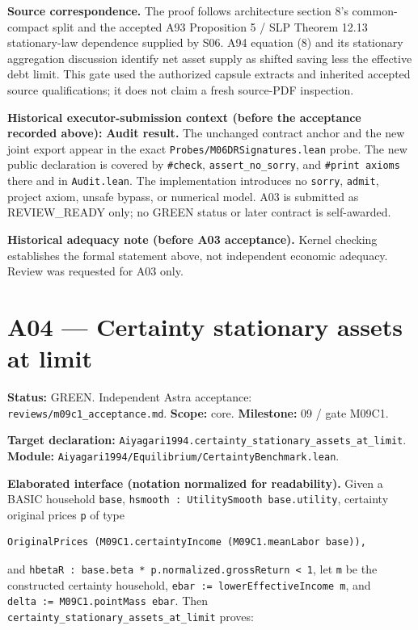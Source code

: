 \documentclass[
  11pt,
]{article}
\let\LedgerOriginalTexttt\texttt
\renewcommand{\texttt}[1]{{\small\LedgerOriginalTexttt{#1}}}
\begin{document}
\textbf{Source correspondence.} The proof follows architecture section
8's common-compact split and the accepted A93 Proposition 5 / SLP
Theorem 12.13 stationary-law dependence supplied by S06. A94 equation
(8) and its stationary aggregation discussion identify net asset supply
as shifted saving less the effective debt limit. This gate used the
authorized capsule extracts and inherited accepted source
qualifications; it does not claim a fresh source-PDF inspection.

\textbf{Historical executor-submission context (before the acceptance
recorded above):} \textbf{Audit result.} The unchanged contract anchor
and the new joint export appear in the exact
\texttt{Probes/M06DRSignatures.lean} probe. The new public declaration
is covered by \texttt{\#check}, \texttt{assert\_no\_sorry}, and
\texttt{\#print\ axioms} there and in \texttt{Audit.lean}. The
implementation introduces no \texttt{sorry}, \texttt{admit}, project
axiom, unsafe bypass, or numerical model. A03 is submitted as
REVIEW\_READY only; no GREEN status or later contract is self-awarded.

\textbf{Historical adequacy note (before A03 acceptance).} Kernel
checking establishes the formal statement above, not independent
economic adequacy. Review was requested for A03 only.

\section{A04 --- Certainty stationary assets at
limit}\label{a04-certainty-stationary-assets-at-limit}

\textbf{Status:} GREEN. Independent Astra acceptance:
\texttt{reviews/m09c1\_acceptance.md}. \textbf{Scope:} core.
\textbf{Milestone:} 09 / gate M09C1.

\textbf{Target declaration:}
\texttt{Aiyagari1994.certainty\_stationary\_assets\_at\_limit}.\\
\textbf{Module:}
\texttt{Aiyagari1994/Equilibrium/CertaintyBenchmark.lean}.

\textbf{Elaborated interface (notation normalized for readability).}
Given a BASIC household \texttt{base},
\texttt{hsmooth\ :\ UtilitySmooth\ base.utility}, certainty original
prices \texttt{p} of type

\begin{verbatim}
OriginalPrices (M09C1.certaintyIncome (M09C1.meanLabor base)),
\end{verbatim}

and
\texttt{hbetaR\ :\ base.beta\ *\ p.normalized.grossReturn\ \textless{}\ 1},
let \texttt{m} be the constructed certainty household,
\texttt{ebar\ :=\ lowerEffectiveIncome\ m}, and
\texttt{delta\ :=\ M09C1.pointMass\ ebar}. Then
\texttt{certainty\_stationary\_assets\_at\_limit} proves:
\end{document}
